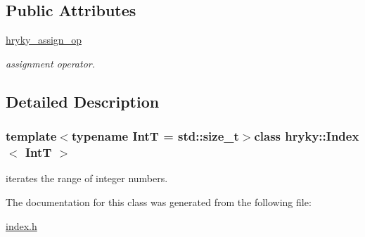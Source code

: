 \subsection*{Public Attributes}
\begin{DoxyCompactItemize}
\item 
\hypertarget{classhryky_1_1_index_a5c6ce58053be9aeff2f78f8ea3d900b4}{\hyperlink{classhryky_1_1_index_a5c6ce58053be9aeff2f78f8ea3d900b4}{hryky\-\_\-assign\-\_\-op}}\label{classhryky_1_1_index_a5c6ce58053be9aeff2f78f8ea3d900b4}

\begin{DoxyCompactList}\small\item\em assignment operator. \end{DoxyCompactList}\end{DoxyCompactItemize}


\subsection{Detailed Description}
\subsubsection*{template$<$typename Int\-T = std\-::size\-\_\-t$>$class hryky\-::\-Index$<$ Int\-T $>$}

iterates the range of integer numbers. 

The documentation for this class was generated from the following file\-:\begin{DoxyCompactItemize}
\item 
\hyperlink{index_8h}{index.\-h}\end{DoxyCompactItemize}

